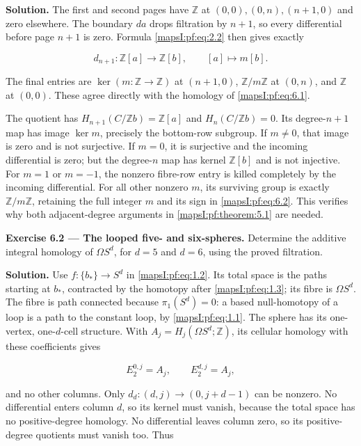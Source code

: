 \documentclass[11pt]{article}
\begin{document}
\textbf{Solution.} The first and second pages have \(\mathbb Z\) at \((0,0),(0,n),(n+1,0)\) and zero elsewhere. The boundary \(da\) drops filtration by \(n+1\), so every differential before page \(n+1\) is zero. Formula \eqref{mapsI:pf:eq:2.2} then gives exactly

\begin{equation}
d_{n+1}:\mathbb Z[a]\longrightarrow\mathbb Z[b],
\qquad [a]\longmapsto m[b].
\label{mapsI:pf:eq:6.2}
\end{equation}

The final entries are \(\ker(m:\mathbb Z\to\mathbb Z)\) at \((n+1,0)\), \(\mathbb Z/m\mathbb Z\) at \((0,n)\), and \(\mathbb Z\) at \((0,0)\). These agree directly with the homology of \eqref{mapsI:pf:eq:6.1}.

The quotient has \(H_{n+1}(C/\mathbb Zb)=\mathbb Z[a]\) and \(H_n(C/\mathbb Zb)=0\). Its degree-\(n+1\) map has image \(\ker m\), precisely the bottom-row subgroup. If \(m\ne0\), that image is zero and is not surjective. If \(m=0\), it is surjective and the incoming differential is zero; but the degree-\(n\) map has kernel \(\mathbb Z[b]\) and is not injective. For \(m=1\) or \(m=-1\), the nonzero fibre-row entry is killed completely by the incoming differential. For all other nonzero \(m\), its surviving group is exactly \(\mathbb Z/m\mathbb Z\), retaining the full integer \(m\) and its sign in \eqref{mapsI:pf:eq:6.2}. This verifies why both adjacent-degree arguments in \cref{mapsI:pf:theorem:5.1} are needed.

\textbf{Exercise 6.2 --- The looped five- and six-spheres.}\label{mapsI:pf:exercise:6.2} Determine the additive integral homology of \(\Omega S^d\), for \(d=5\) and \(d=6\), using the proved filtration.

\textbf{Solution.} Use \(f:\{b_*\}\to S^d\) in \eqref{mapsI:pf:eq:1.2}. Its total space is the paths starting at \(b_*\), contracted by the homotopy after \eqref{mapsI:pf:eq:1.3}; its fibre is \(\Omega S^d\). The fibre is path connected because \(\pi_1(S^d)=0\): a based null-homotopy of a loop is a path to the constant loop, by \eqref{mapsI:pf:eq:1.1}. The sphere has its one-vertex, one-\(d\)-cell structure. With \(A_j=H_j(\Omega S^d;\mathbb Z)\), its cellular homology with these coefficients gives

\begin{equation}
E_2^{0,j}=A_j,\qquad E_2^{d,j}=A_j,
\label{mapsI:pf:eq:6.3}
\end{equation}

and no other columns. Only \(d_d:(d,j)\to(0,j+d-1)\) can be nonzero. No differential enters column \(d\), so its kernel must vanish, because the total space has no positive-degree homology. No differential leaves column zero, so its positive-degree quotients must vanish too. Thus
\end{document}
